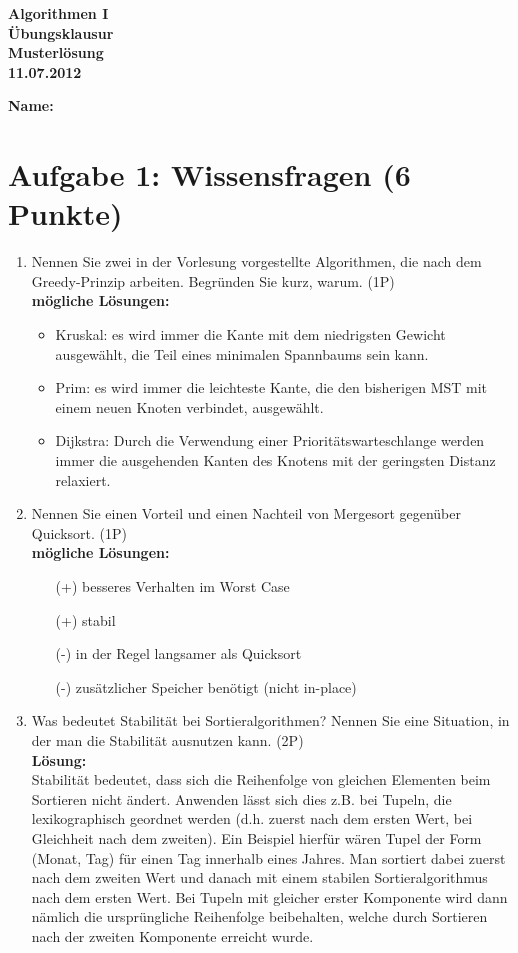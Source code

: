 \documentclass{scrartcl}
\begin{document}
\TabPositions{0.8cm, 1.6cm, 2.4cm, 3.2cm}

\begin{center}
	{\huge \textbf{Algorithmen I} \\
			\textbf{Übungsklausur}\\
			\textbf{Musterlösung} \\
			\textbf{11.07.2012}}
\end{center}
\textbf{Name:}\\
\section*{Aufgabe 1: Wissensfragen (6 Punkte)}
\begin{enumerate}[(1)]
\item Nennen Sie zwei in der Vorlesung vorgestellte Algorithmen, die nach dem Greedy-Prinzip arbeiten. Begründen Sie kurz, warum. (1P)\\
\textbf{mögliche Lösungen:}
\begin{itemize}
\item Kruskal: es wird immer die Kante mit dem niedrigsten Gewicht ausgewählt, die Teil eines minimalen Spannbaums sein kann.
\item Prim: es wird immer die leichteste Kante, die den bisherigen MST mit einem neuen Knoten verbindet, ausgewählt.
\item Dijkstra: Durch die Verwendung einer Prioritätswarteschlange werden immer die ausgehenden Kanten des Knotens mit der geringsten Distanz relaxiert.
\end{itemize}

\item Nennen Sie einen Vorteil und einen Nachteil von Mergesort gegenüber Quicksort. (1P)\\
\textbf{mögliche Lösungen:}
\begin{itemize}
\item[(+)] besseres Verhalten im Worst Case
\item[(+)] stabil
\item[(-)] in der Regel langsamer als Quicksort
\item[(-)] zusätzlicher Speicher benötigt (nicht in-place)
\end{itemize}

\item Was bedeutet Stabilität bei Sortieralgorithmen? Nennen Sie eine Situation, in der man die Stabilität ausnutzen kann. (2P)\\
\textbf{Lösung:}\\
Stabilität bedeutet, dass sich die Reihenfolge von gleichen Elementen beim Sortieren nicht ändert. Anwenden lässt sich dies z.B. bei Tupeln, die lexikographisch geordnet werden (d.h. zuerst nach dem ersten Wert, bei Gleichheit nach dem zweiten). Ein Beispiel hierfür wären Tupel der Form (Monat, Tag) für einen Tag innerhalb eines Jahres. Man sortiert dabei zuerst nach dem zweiten Wert und danach mit einem stabilen Sortieralgorithmus nach dem ersten Wert. Bei Tupeln mit gleicher erster Komponente wird dann nämlich die ursprüngliche Reihenfolge beibehalten, welche durch Sortieren nach der zweiten Komponente erreicht wurde.


\end{enumerate}
\end{document}

